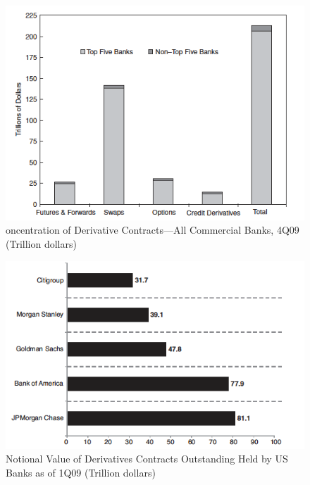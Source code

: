 \documentclass[11pt]{beamer}
\begin{document}
\begin{frame}
\begin{figure}
\includegraphics[width=\textwidth]{13_4.png}
\caption{oncentration of Derivative Contracts—All Commercial Banks, 4Q09 (Trillion dollars)}
\end{figure}
\end{frame}

\begin{frame}
\begin{figure}
\includegraphics[width=\textwidth]{13_5.png}
\caption{Notional Value of Derivatives Contracts Outstanding Held by
US Banks as of 1Q09 (Trillion dollars)}
\end{figure}
\end{frame}
\end{document}
